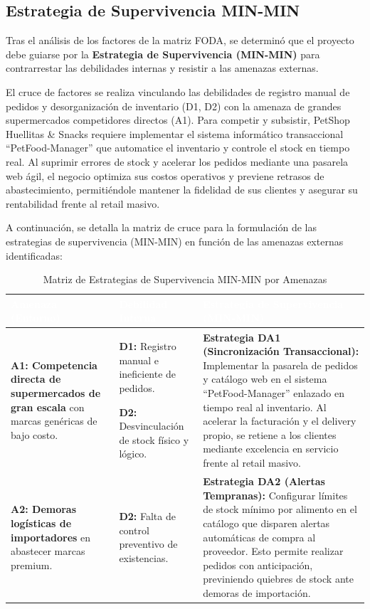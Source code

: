 \documentclass[11pt,a4paper]{article}
\begin{document}
\subsection{Estrategia de Supervivencia MIN-MIN}\label{sec:estrategia}
Tras el análisis de los factores de la matriz FODA, se determinó que el proyecto debe guiarse por la \textbf{Estrategia de Supervivencia (MIN-MIN)} para contrarrestar las debilidades internas y resistir a las amenazas externas. 

El cruce de factores se realiza vinculando las debilidades de registro manual de pedidos y desorganización de inventario (D1, D2) con la amenaza de grandes supermercados competidores directos (A1). Para competir y subsistir, PetShop Huellitas \& Snacks requiere implementar el sistema informático transaccional ``PetFood-Manager'' que automatice el inventario y controle el stock en tiempo real. Al suprimir errores de stock y acelerar los pedidos mediante una pasarela web ágil, el negocio optimiza sus costos operativos y previene retrasos de abastecimiento, permitiéndole mantener la fidelidad de sus clientes y asegurar su rentabilidad frente al retail masivo.

A continuación, se detalla la matriz de cruce para la formulación de las estrategias de supervivencia (MIN-MIN) en función de las amenazas externas identificadas:

\begin{table}[H]
    \centering
    \small
    \renewcommand{\arraystretch}{1.4}
    \begin{tabularx}{\textwidth}{|L|p{4cm}|L|}
        \hline
        \textcolor{white}{\textbf{Amenaza (Entorno)}} & 
        \textcolor{white}{\textbf{Debilidad Interna}} & 
        \textcolor{white}{\textbf{Estrategia de Supervivencia (MIN-MIN)}} \\
        \hline
        \textbf{A1: Competencia directa de supermercados de gran escala} con marcas genéricas de bajo costo. & 
        \textbf{D1:} Registro manual e ineficiente de pedidos. \par
        \textbf{D2:} Desvinculación de stock físico y lógico. & 
        \textbf{Estrategia DA1 (Sincronización Transaccional):} Implementar la pasarela de pedidos y catálogo web en el sistema ``PetFood-Manager'' enlazado en tiempo real al inventario. Al acelerar la facturación y el delivery propio, se retiene a los clientes mediante excelencia en servicio frente al retail masivo. \\
        \hline
        \textbf{A2: Demoras logísticas de importadores} en abastecer marcas premium. & 
        \textbf{D2:} Falta de control preventivo de existencias. & 
        \textbf{Estrategia DA2 (Alertas Tempranas):} Configurar límites de stock mínimo por alimento en el catálogo que disparen alertas automáticas de compra al proveedor. Esto permite realizar pedidos con anticipación, previniendo quiebres de stock ante demoras de importación. \\
        \hline
    \end{tabularx}
    \caption{Matriz de Estrategias de Supervivencia MIN-MIN por Amenazas}
    \label{tab:estrategias_minmin}
\end{table}
\end{document}

